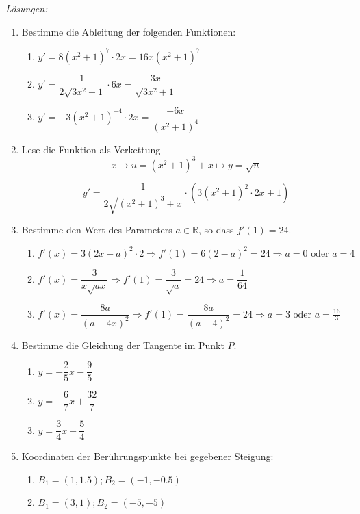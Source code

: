 \clearpage
\emph{Lösungen:}
\begin{enumerate}
	\item Bestimme die Ableitung der folgenden Funktionen:
	      \begin{enumerate}
		      \item \( y' = 8(x^2+1)^7 \cdot 2x = 16x(x^2+1)^7 \)
		      \item \( y' = \dfrac{1}{2\sqrt{3x^2+1}} \cdot 6x = \dfrac{3x}{\sqrt{3x^2+1}} \)
		      \item \( y' = -3(x^2+1)^{-4} \cdot 2x = \dfrac{-6x}{(x^2+1)^4} \)
	      \end{enumerate}

	\item Lese die Funktion als Verkettung
	      $$ x \mapsto u = (x^2+1)^3+x \mapsto y = \sqrt{u}$$

	      \[
		      y' = \dfrac{1}{2\sqrt{(x^2+1)^3+x}} \cdot \left(3(x^2+1)^2 \cdot 2x + 1\right)
	      \]

	\item Bestimme den Wert des Parameters \( a \in \mathbb{R} \), so dass \( f'(1) = 24 \).
	      \begin{enumerate}
		      \item \( f'(x) = 3(2x - a)^2 \cdot 2 \Rightarrow f'(1) = 6(2 - a)^2 = 24 \Rightarrow a = 0 \text{ oder } a = 4 \)
		      \item \( f'(x) = \dfrac{3}{x\sqrt{ax}} \Rightarrow f'(1) = \dfrac{3}{\sqrt{a}} = 24 \Rightarrow a = \dfrac{1}{64} \)
		      \item \( f'(x) = \dfrac{8a}{(a - 4x)^2} \Rightarrow f'(1) = \dfrac{8a}{(a - 4)^2} = 24 \Rightarrow a = 3 \text{ oder } a = \frac{16}{3} \)
	      \end{enumerate}

	\item Bestimme die Gleichung der Tangente im Punkt \( P \).
	      \begin{enumerate}
		      \item \( y = -\dfrac{2}{5}x - \dfrac{9}{5} \)
		      \item \( y = -\dfrac{6}{7}x + \dfrac{32}{7} \)
		      \item \( y = \dfrac{3}{4}x + \dfrac{5}{4} \)
	      \end{enumerate}

	\item Koordinaten der Berührungspunkte bei gegebener Steigung:
	      \begin{enumerate}
		      \item \( B_1 = (1, 1.5); B_2 = (-1, -0.5) \)
		      \item \( B_1 = (3, 1); B_2 = (-5, -5) \)
	      \end{enumerate}


\end{enumerate}

